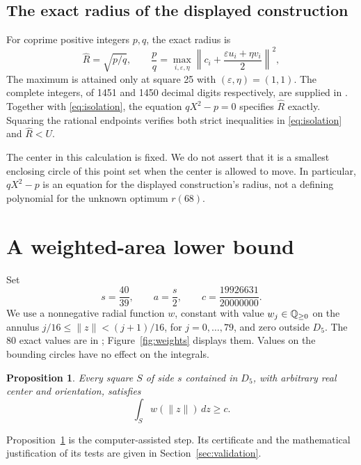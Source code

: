 \documentclass[11pt]{article}
\newtheorem{proposition}{Proposition}
\begin{document}
\subsection{The exact radius of the displayed construction}
For coprime positive integers $p,q$, the exact radius is
\begin{equation}\label{eq:radius}
\widehat R=\sqrt{p/q},\qquad
\frac pq=\max_{i,\varepsilon,\eta}
\left\|c_i+\frac{\varepsilon u_i+\eta v_i}{2}\right\|^2,
\end{equation}
The maximum is attained only at square 25 with $(\varepsilon,\eta)=(1,1)$. The complete integers, of 1451 and 1450 decimal digits respectively, are supplied in . Together with \eqref{eq:isolation}, the equation $qX^2-p=0$ specifies $\widehat R$ exactly. Squaring the rational endpoints verifies both strict inequalities in \eqref{eq:isolation} and $\widehat R<U$.

The center in this calculation is fixed. We do not assert that it is a smallest enclosing circle of this point set when the center is allowed to move. In particular, $qX^2-p$ is an equation for the displayed construction's radius, not a defining polynomial for the unknown optimum $r(68)$.

\section{A weighted-area lower bound}\label{sec:weight}
Set
\begin{equation}\label{eq:parameters}
s=\frac{40}{39},\qquad a=\frac{s}{2},\qquad
c=\frac{19926631}{20000000}.
\end{equation}
We use a nonnegative radial function $w$, constant with value $w_j\in\mathbb Q_{\ge0}$ on the annulus $j/16\le\|z\|<(j+1)/16$, for $j=0,\ldots,79$, and zero outside $D_5$. The 80 exact values are in ; Figure~\ref{fig:weights} displays them. Values on the bounding circles have no effect on the integrals.

\begin{proposition}\label{prop:weight}
Every square $S$ of side $s$ contained in $D_5$, with arbitrary real center and orientation, satisfies
\begin{equation}\label{eq:single}
\int_S w(\|z\|)\,dz\ge c.
\end{equation}
\end{proposition}

Proposition~\ref{prop:weight} is the computer-assisted step. Its certificate and the mathematical justification of its tests are given in Section~\ref{sec:validation}.
\end{document}

